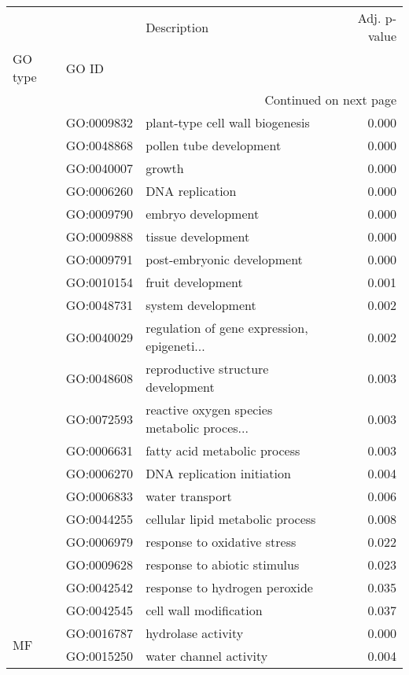\begin{longtable}{lllr}
\toprule
   &            &                                  Description &  Adj. p-value \\
GO type & GO ID &                                              &               \\
\midrule
\endhead
\midrule
\multicolumn{4}{r}{{Continued on next page}} \\
\midrule
\endfoot

\bottomrule
\endlastfoot
\multirow{20}{*}{BP} & GO:0009832 &              plant-type cell wall biogenesis &         0.000 \\
   & GO:0048868 &                      pollen tube development &         0.000 \\
   & GO:0040007 &                                       growth &         0.000 \\
   & GO:0006260 &                              DNA replication &         0.000 \\
   & GO:0009790 &                           embryo development &         0.000 \\
   & GO:0009888 &                           tissue development &         0.000 \\
   & GO:0009791 &                   post-embryonic development &         0.000 \\
   & GO:0010154 &                            fruit development &         0.001 \\
   & GO:0048731 &                           system development &         0.002 \\
   & GO:0040029 &  regulation of gene expression, epigeneti... &         0.002 \\
   & GO:0048608 &           reproductive structure development &         0.003 \\
   & GO:0072593 &  reactive oxygen species metabolic proces... &         0.003 \\
   & GO:0006631 &                 fatty acid metabolic process &         0.003 \\
   & GO:0006270 &                   DNA replication initiation &         0.004 \\
   & GO:0006833 &                              water transport &         0.006 \\
   & GO:0044255 &             cellular lipid metabolic process &         0.008 \\
   & GO:0006979 &                 response to oxidative stress &         0.022 \\
   & GO:0009628 &                 response to abiotic stimulus &         0.023 \\
   & GO:0042542 &                response to hydrogen peroxide &         0.035 \\
   & GO:0042545 &                       cell wall modification &         0.037 \\
\cline{1-4}
\multirow{2}{*}{MF} & GO:0016787 &                           hydrolase activity &         0.000 \\
   & GO:0015250 &                       water channel activity &         0.004 \\
\end{longtable}
